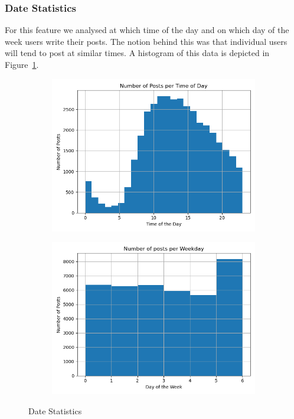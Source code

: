 \documentclass[acmsmall]{acmart}
\begin{document}
\subsubsection{Date Statistics}
For this feature we analysed at which time of the day and on which day of the week users write their posts. 
The notion behind this was that individual users will tend to post at similar times.
A histogram of this data is depicted in Figure~\ref{fig:date_stats}.

\begin{figure}
\centering
\begin{subfigure}{.5\textwidth}
\centering
  \includegraphics[width=.9\linewidth]{assets/Number_of_posts_per_time_of_day.png}
 \end{subfigure}%
\begin{subfigure}{.5\textwidth}
\centering
  \includegraphics[width=.9\linewidth]{assets/Number_of_posts_per_day_of_week.png}
 \end{subfigure}
 \caption{Date Statistics}
\label{fig:date_stats}
\end{figure}
\end{document}
